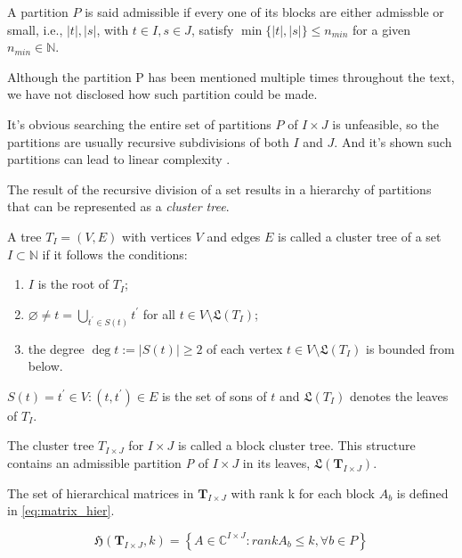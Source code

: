 A partition $P$ is said admissible if every one of its blocks are either admissble or small, i.e., $|t|, |s|$, with $t \in I, s \in J$, satisfy $\min\{|t|,|s| \} \leq n_{min}$ for a given $n_{min} \in \mathbb{N}$.

Although the partition P has been mentioned multiple times throughout the text, we have not disclosed how such partition could be made.

It's obvious searching the entire set of partitions $P$ of $I \times J$ is unfeasible, so the partitions are usually  recursive subdivisions of both $I$ and $J$. And it's shown such partitions can lead to linear complexity \cite{bebendorf2008hierarchical}.

The result of the recursive division of a set results in a hierarchy of partitions that can be represented as a \textit{cluster tree}.

A tree $T_{I} = (V,E)$ with vertices $V$ and edges $E$ is called a cluster tree of a set $I\subset \mathbb{N}$ if it follows the conditions:

\begin{enumerate}
    \item $I$ is the root of $T_{I}$;
    \item $\varnothing \neq t = \bigcup_{t^{'} \in S(t)} t^{'} $ for all $t \in V \setminus   \mathfrak{L}(T_{I}) $;
    \item the degree $\deg t := |S(t)| \geq 2$ of each vertex $t \in V \setminus \mathfrak{L}(T_{I})$ is bounded from below.
\end{enumerate}

$S(t)={t^{'} \in V : (t,t^{'})\in E}$ is the set of sons of $t$ and $\mathfrak{L}(T_{I})$ denotes the leaves of $T_{I}$.


The cluster tree $T_{I \times J}$ for $I \times J$ is called a block cluster tree. This structure contains an admissible partition \textit{P} of $ I \times J$ in its leaves, $\mathfrak{L}(\mathbf{T}_{I \times J})$.

The set of hierarchical matrices in $\mathbf{T}_{I \times J}$ with rank k for each block $A_{b}$ is defined in \ref{eq:matrix_hier}.

\begin{equation}\label{eq:matrix_hier}
    \mathfrak{H}(\mathbf{T}_{I \times J},k) = \left\{  A\in \mathbb{C}^{I\times J} : rankA_{b} \leq k, \forall b \in P \right\}
\end{equation}

